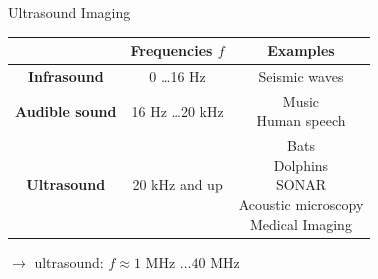 \begin{frame}{Ultrasound Imaging \cont}

    \vspace{.3cm}
    \begin{center}
        \begin{tabular}{c|c|c|}
            \hline
            {}                     & {Frequencies $f$}  & {Examples}         \\\hline\hline
            \textbf{Infrasound}    & 0 \dots 16 Hz      & Seismic waves      \\\hline
            \textbf{Audible sound} & 16 Hz \dots 20 kHz & \specialcell{Music \\Human speech}\\\hline
            \textbf{Ultrasound}    & 20 kHz and up      & \specialcell{Bats  \\Dolphins\\SONAR\\Acoustic microscopy\\Medical Imaging}\\\hline
        \end{tabular}
    \end{center}

    \vspace{.6cm}
    $\rightarrow$  ultrasound: $f \approx 1$ MHz $\dots 40$ MHz
\end{frame}


